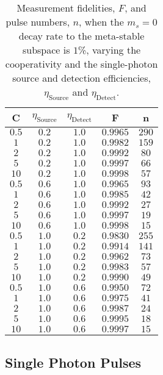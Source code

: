 \documentclass[aps,pra,amsmath,amssymb,reprint,superscriptaddress,tightenlines]{revtex4-1}
\begin{document}
\begin{table}[tbht]
\caption{\label{tbl:realParamPerformance} Measurement fidelities, $F$, and pulse numbers, $n$, when the $m_{s}=0$ decay rate to the meta-stable subspace is $1$\%, varying the cooperativity and the single-photon source and detection efficiencies, $\eta_{\text{Source}}$ and $\eta_{\text{Detect}}$.}
\begin{ruledtabular}
\begin{tabular}{ c | c | c | c | c }
		C & $\eta_{\text{Source}}$ & $\eta_{\text{Detect}}$ & F & n \\
		\hline
		 $0.5$ & $0.2$ & $1.0$ & $0.9965$ & $290$ \\
		 $1$ & $0.2$ & $1.0$ & $0.9982$ & $159$ \\
		 $2$ & $0.2$ & $1.0$ & $0.9992$ & $80$ \\
		 $5$ & $0.2$ & $1.0$ & $0.9997$ & $66$ \\
		$10$ & $0.2$ & $1.0$ & $0.9998$ & $57$ \\
		\hline
		 $0.5$ & $0.6$ & $1.0$ & $0.9965$ & $93$ \\
		 $1$ & $0.6$ & $1.0$ & $0.9985$ & $42$ \\
		 $2$ & $0.6$ & $1.0$ & $0.9992$ & $27$ \\
		 $5$ & $0.6$ & $1.0$ & $0.9997$ & $19$ \\
		$10$ & $0.6$ & $1.0$ & $0.9998$ & $15$\\
		\hline
		 $0.5$ & $1.0$ & $0.2$ & $0.9830$ & $255$ \\
		 $1$ & $1.0$ & $0.2$ & $0.9914$ & $141$ \\
		 $2$ & $1.0$ & $0.2$ & $0.9962$ & $73$ \\
		 $5$ & $1.0$ & $0.2$ & $0.9983$ & $57$ \\
		$10$ & $1.0$ & $0.2$ & $0.9990$ & $49$ \\
		\hline
		 $0.5$ & $1.0$ & $0.6$ & $0.9950$ & $72$ \\
		 $1$ & $1.0$ & $0.6$ & $0.9975$ & $41$ \\
		 $2$ & $1.0$ & $0.6$ & $0.9987$ & $24$ \\
		 $5$ & $1.0$ & $0.6$ & $0.9995$ & $18$ \\
		$10$ & $1.0$ & $0.6$ & $0.9997$ & $15$
\end{tabular}
\end{ruledtabular}
\end{table}

\subsection{Single Photon Pulses} 
\label{sec:finite_bandwidth_photons}
\end{document}
